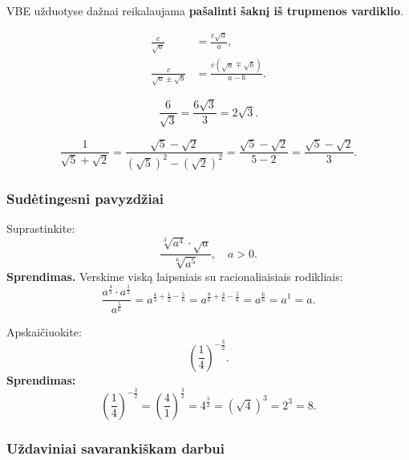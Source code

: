 VBE užduotyse dažnai reikalaujama \textbf{pašalinti šaknį iš trupmenos
vardiklio}.

\begin{tcolorbox}[title={Racionalizavimo formulės},
                  colback=yellow!10!white, colframe=orange!80!black]
\begin{align*}
    \frac{c}{\sqrt{a}} &= \frac{c\sqrt{a}}{a}, \\[6pt]
    \frac{c}{\sqrt{a} \pm \sqrt{b}}
    &= \frac{c\left(\sqrt{a} \mp \sqrt{b}\right)}{a - b}.
\end{align*}
\end{tcolorbox}

\begin{example}
\[
    \frac{6}{\sqrt{3}} = \frac{6\sqrt{3}}{3} = 2\sqrt{3}.
\]
\end{example}

\begin{example}
\[
    \frac{1}{\sqrt{5}+\sqrt{2}}
    = \frac{\sqrt{5}-\sqrt{2}}{(\sqrt{5})^2-(\sqrt{2})^2}
    = \frac{\sqrt{5}-\sqrt{2}}{5-2}
    = \frac{\sqrt{5}-\sqrt{2}}{3}.
\]
\end{example}

\subsubsection*{Sudėtingesni pavyzdžiai}

\begin{example}
Suprastinkite:
\[
    \frac{\sqrt[3]{a^4} \cdot \sqrt{a}}{\sqrt[6]{a^5}},
    \quad a > 0.
\]
\textbf{Sprendimas.} Verskime viską laipsniais su racionaliaisiais rodikliais:
\[
    \frac{a^{\frac{4}{3}} \cdot a^{\frac{1}{2}}}{a^{\frac{5}{6}}}
    = a^{\frac{4}{3} + \frac{1}{2} - \frac{5}{6}}
    = a^{\frac{8}{6} + \frac{3}{6} - \frac{5}{6}}
    = a^{\frac{6}{6}}
    = a^1 = a.
\]
\end{example}

\begin{example}
Apskaičiuokite:
\[
    \left(\frac{1}{4}\right)^{-\frac{3}{2}}.
\]
\textbf{Sprendimas:}
\[
    \left(\frac{1}{4}\right)^{-\frac{3}{2}}
    = \left(\frac{4}{1}\right)^{\frac{3}{2}}
    = 4^{\frac{3}{2}}
    = \left(\sqrt{4}\right)^3
    = 2^3 = 8.
\]
\end{example}

\subsubsection*{Uždaviniai savarankiškam darbui}

